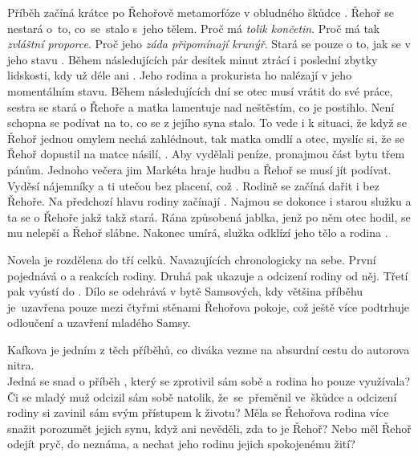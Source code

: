 \documentclass{extarticle} %
\begin{document}
\noindent Příběh začíná krátce po Řehořově metamorfóze v obludného škůdce
.
Řehoř se nestará o~to, co~se~stalo s~jeho tělem.
Proč má \textit{tolik končetin}.
Proč má tak \textit{zvláštní proporce}.
Proč jeho \textit{záda připomínají krunýř}.
Stará se pouze o to, jak se v jeho stavu .
Během následujících pár desítek minut ztrácí i poslední zbytky lidskosti,
kdy už déle ani .
Jeho rodina a prokurista ho nalézají v jeho momentálním stavu.
Během následujících dní se otec musí vrátit do své práce,
sestra se stará o Řehoře a matka lamentuje nad neštěstím, co je postihlo.
Není schopna se podívat na to, co se z jejího syna stalo.
To vede i k situaci, že když se Řehoř jednou omylem nechá zahlédnout,
tak matka omdlí a otec, myslíc si, že se Řehoř dopustil na matce násilí,
.
Aby vydělali peníze, pronajmou část bytu třem pánům.
Jednoho večera jim Markéta hraje hudbu a Řehoř se musí jít podívat.
Vyděsí nájemníky a ti utečou bez placení, což .
Rodině se začíná dařit i bez Řehoře.
Na předchozí hlavu rodiny začínají .
Najmou se dokonce i starou služku a ta se o Řehoře jakž takž stará.
Rána způsobená jablka, jenž po něm otec hodil, se mu nelepší a Řehoř slábne.
Nakonec umírá, služka odklízí jeho tělo a rodina .

\noindent Novela je rozdělena do tří celků.
Navazujících chronologicky na sebe.
První pojednává o  a reakcích rodiny.
Druhá pak ukazuje  a odcizení rodiny od něj.
Třetí pak vyústí do .
Dílo se odehrává v bytě Samsových,
kdy většina příběhu je~uzavřena pouze mezi čtyřmi stěnami Řehořova pokoje,
což ještě více podtrhuje odloučení a uzavření mladého Samsy.

\noindent Kafkova  je jedním z těch příběhů,
co diváka vezme na absurdní cestu do autorova nitra. \\
Jedná se snad o příběh , který se zprotivil sám sobě
a rodina ho pouze využívala?
Či se mladý muž odcizil sám sobě natolik, že~se~přeměnil ve~škůdce
a odcizení rodiny si zavinil sám svým přístupem k životu?
Měla se Řehořova rodina více snažit porozumět jejich synu,
když ani nevěděli, zda to je Řehoř?
Nebo měl Řehoř odejít pryč, do neznáma, a nechat jeho rodinu jejich spokojenému žití?
\end{document}
